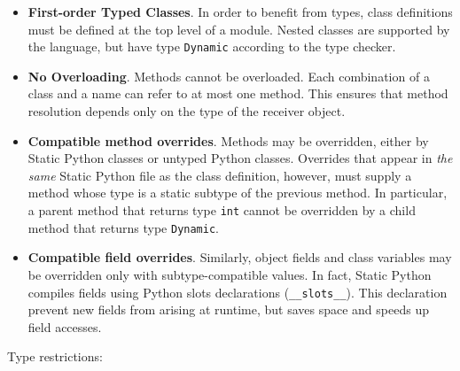 \documentclass[english,cleveref,submission]{programming}
\newcommand{\SP}{Static Python}
\newcommand{\code}[1]{\texttt{#1}}
\begin{document}
\begin{itemize}
  \item \textbf{First-order Typed Classes}.
    In order to benefit from types, class definitions must be defined at the top level of a module.
    Nested classes are supported by the language, but have type \code{Dynamic} according
    to the type checker.

  \item \textbf{No Overloading}.
    Methods cannot be overloaded. Each combination of a class
    and a name can refer to at most one method.
    This ensures that method resolution depends only on the
    type of the receiver object.


  \item \textbf{Compatible method overrides}.
    Methods may be overridden, either by \SP{} classes or
    untyped Python classes.
    Overrides that appear in \emph{the same} \SP{} file as the class definition, however,
    must supply a method whose type is a static subtype of the previous method.
    In particular, a parent method that returns type \code{int} cannot be
    overridden by a child method that returns type \code{Dynamic}.


  \item \textbf{Compatible field overrides}.
    Similarly, object fields and class variables may be overridden
    only with subtype-compatible values.
    In fact, \SP{} compiles fields using Python slots
    declarations (\code{\_\_slots\_\_}).
    This declaration prevent new fields from arising at runtime,
    but saves space and speeds up field accesses.


\end{itemize}


Type restrictions:
\end{document}
